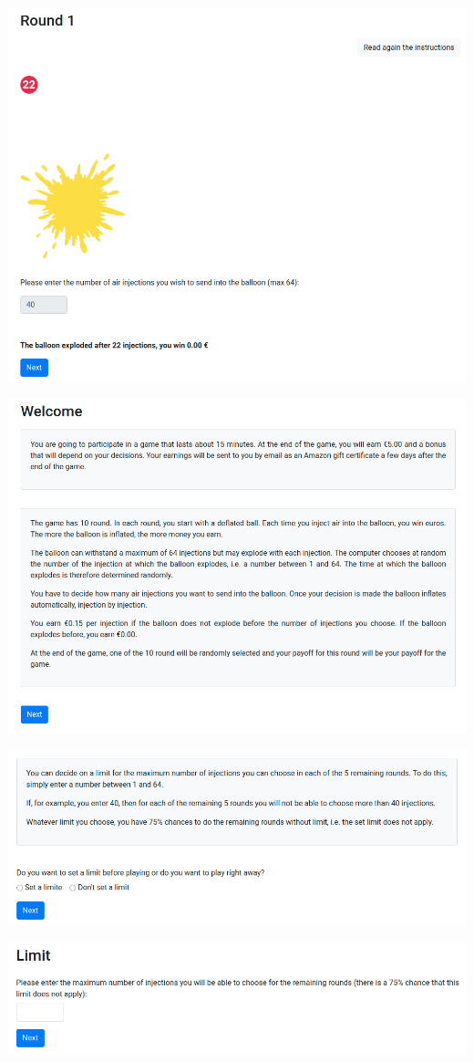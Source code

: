 \documentclass[
]{book}
\begin{document}
\includegraphics[width=0.9\linewidth]{annexe_file/pump_explosion}

\includegraphics[width=0.9\linewidth]{annexe_file/pump_instructions}

\includegraphics[width=0.9\linewidth]{annexe_file/temptation_instructions}

\includegraphics[width=0.9\linewidth]{annexe_file/temptation_decision}
\end{document}
